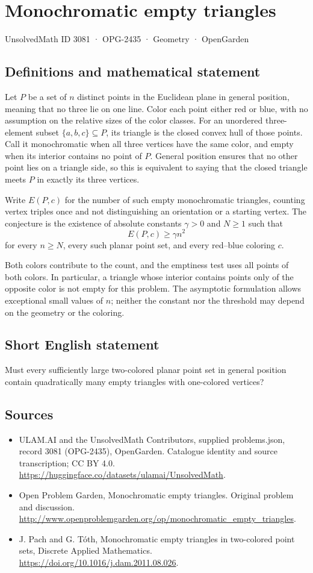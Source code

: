\documentclass[11pt,a4paper]{article}
\begin{document}
\section*{Monochromatic empty triangles}\label{3081}
{\small UnsolvedMath ID 3081 · OPG-2435 · Geometry · OpenGarden}
\subsection{Definitions and mathematical statement}
Let $P$ be a set of $n$ distinct points in the Euclidean plane in general position, meaning that no three lie on one line. Color each point either red or blue, with no assumption on the relative sizes of the color classes. For an unordered three-element subset $\{a,b,c\}\subseteq P$, its triangle is the closed convex hull of those points. Call it monochromatic when all three vertices have the same color, and empty when its interior contains no point of $P$. General position ensures that no other point lies on a triangle side, so this is equivalent to saying that the closed triangle meets $P$ in exactly its three vertices.

Write $E(P,c)$ for the number of such empty monochromatic triangles, counting vertex triples once and not distinguishing an orientation or a starting vertex. The conjecture is the existence of absolute constants $\gamma>0$ and $N\ge1$ such that
\[
 E(P,c)\ge\gamma n^2
\]
for every $n\ge N$, every such planar point set, and every red--blue coloring $c$.

Both colors contribute to the count, and the emptiness test uses all points of both colors. In particular, a triangle whose interior contains points only of the opposite color is not empty for this problem. The asymptotic formulation allows exceptional small values of $n$; neither the constant nor the threshold may depend on the geometry or the coloring.
\subsection{Short English statement}
Must every sufficiently large two-colored planar point set in general position contain quadratically many empty triangles with one-colored vertices?
\subsection{Sources}
\begin{itemize}
\item[S1] ULAM.AI and the UnsolvedMath Contributors, supplied problems.json, record 3081 (OPG-2435), OpenGarden. Catalogue identity and source transcription; CC BY 4.0.
\url{https://huggingface.co/datasets/ulamai/UnsolvedMath}.
\item[S2] Open Problem Garden, Monochromatic empty triangles. Original problem and discussion.
\url{http://www.openproblemgarden.org/op/monochromatic_empty_triangles}.
\item[S3] J. Pach and G. Tóth, Monochromatic empty triangles in two-colored point sets, Discrete Applied Mathematics.
\url{https://doi.org/10.1016/j.dam.2011.08.026}.
\end{itemize}
\end{document}
